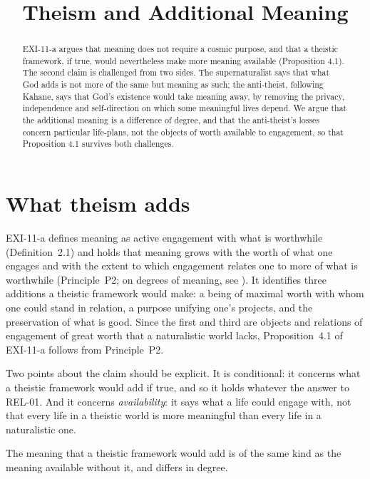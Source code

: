 \documentclass{situationist-preprint}
\title{Theism and Additional Meaning}
\begin{document}
\maketitle

\begin{abstract}
EXI-11-a argues that meaning does not require a cosmic purpose, and that a theistic framework, if true, would nevertheless make more meaning available (Proposition 4.1). The second claim is challenged from two sides. The supernaturalist says that what God adds is not more of the same but meaning as such; the anti-theist, following Kahane, says that God's existence would take meaning away, by removing the privacy, independence and self-direction on which some meaningful lives depend. We argue that the additional meaning is a difference of degree, and that the anti-theist's losses concern particular life-plans, not the objects of worth available to engagement, so that Proposition 4.1 survives both challenges.
\end{abstract}

\section{What theism adds}

EXI-11-a defines meaning as active engagement with what is worthwhile (Definition~2.1) and holds that meaning grows with the worth of what one engages and with the extent to which engagement relates one to more of what is worthwhile (Principle~P2; on degrees of meaning, see \citealp{Metz2013}). It identifies three additions a theistic framework would make: a being of maximal worth with whom one could stand in relation, a purpose unifying one's projects, and the preservation of what is good. Since the first and third are objects and relations of engagement of great worth that a naturalistic world lacks, Proposition~4.1 of EXI-11-a follows from Principle~P2.

Two points about the claim should be explicit. It is conditional: it concerns what a theistic framework would add if true, and so it holds whatever the answer to REL-01. And it concerns \emph{availability}: it says what a life could engage with, not that every life in a theistic world is more meaningful than every life in a naturalistic one.

\begin{proposition}\label{p:degree}
The meaning that a theistic framework would add is of the same kind as the meaning available without it, and differs in degree.
\end{proposition}
\end{document}

